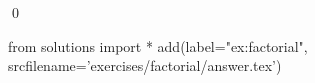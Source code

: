 
\begin{ex} 
  \label{ex:factorial}
  
  \qed
\end{ex} 
\begin{python0}
from solutions import *
add(label="ex:factorial",
    srcfilename='exercises/factorial/answer.tex') 
\end{python0}
